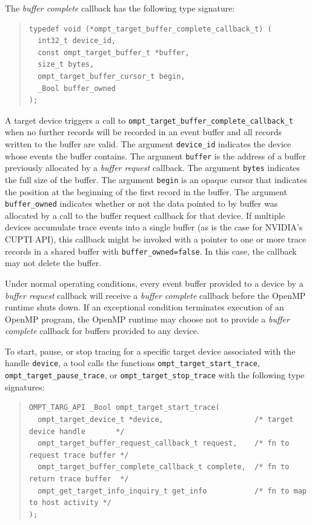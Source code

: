 \documentclass{article}
\begin{document}
The \emph{buffer complete} callback has the following type signature: 
\begin{quote}
\begin{verbatim}
typedef void (*ompt_target_buffer_complete_callback_t) (
  int32_t device_id, 
  const ompt_target_buffer_t *buffer,
  size_t bytes,
  ompt_target_buffer_cursor_t begin,
  _Bool buffer_owned
);
\end{verbatim}
\end{quote}
A target device triggers a call to \verb|ompt_target_buffer_complete_callback_t| when no further records will be recorded in an event buffer and all records written to the buffer are valid. 
The argument \verb|device_id| indicates the device whose events the buffer contains. The argument \verb|buffer| is the address of a buffer previously allocated by a \emph{buffer request} callback. The argument \verb|bytes| indicates the full size of the buffer. The argument \verb|begin| is an opaque cursor that indicates the position at the beginning of the first record in the buffer. The argument \verb|buffer_owned| indicates whether or not the data pointed to by buffer was allocated by a call to the buffer request callback for that device. If multiple devices accumulate trace events into a single buffer (as is the case for NVIDIA's CUPTI API), this callback might be invoked with a pointer to one or more trace records in a shared buffer with \verb|buffer_owned=false|. In this case, the callback may not delete the buffer.

Under normal operating conditions, every event buffer provided to a device by a \emph{buffer request} callback will receive a \emph{buffer complete} callback before the OpenMP runtime shuts down. If an exceptional condition terminates  execution of an OpenMP program, the OpenMP runtime may choose not to provide a \emph{buffer complete} callback for buffers provided to any device.

To start, pause, or stop tracing for a specific target device associated with the handle \verb|device|, 
a tool calls the functions \verb|ompt_target_start_trace|, \verb|ompt_target_pause_trace|, or \verb|ompt_target_stop_trace| with the following type signatures:
\begin{quote}
\begin{verbatim}
OMPT_TARG_API _Bool ompt_target_start_trace(
  ompt_target_device_t *device,                     /* target device handle       */
  ompt_target_buffer_request_callback_t request,    /* fn to request trace buffer */
  ompt_target_buffer_complete_callback_t complete,  /* fn to return trace buffer  */
  ompt_get_target_info_inquiry_t get_info           /* fn to map to host activity */
);
\end{verbatim}
\end{quote}
\end{document}
